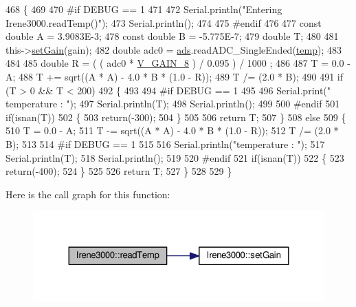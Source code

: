 \begin{DoxyCode}
468 \{
469 
470 \textcolor{preprocessor}{#if DEBUG == 1 }
471 
472     Serial.println(\textcolor{stringliteral}{"Entering Irene3000.readTemp()"});
473     Serial.println();
474 
475 \textcolor{preprocessor}{#endif}
476 
477     \textcolor{keyword}{const} \textcolor{keywordtype}{double} A = 3.9083E-3;
478     \textcolor{keyword}{const} \textcolor{keywordtype}{double} B = -5.775E-7;
479     \textcolor{keywordtype}{double} T;
480 
481     this->\hyperlink{classIrene3000_aff7c5da186b388e7272e63ff88a20c34}{setGain}(gain);
482     \textcolor{keywordtype}{double} adc0 = \hyperlink{classIrene3000_a1215e77ba761c9908d80d691f149e135}{ads}.readADC\_SingleEnded(\hyperlink{Irene3000_8h_a5905d48604152cf57aa6bfa087b49173}{temp});
483 
484 
485     \textcolor{keywordtype}{double} R = ( ( adc0 * \hyperlink{Irene3000_8h_ab7ab16df599d3f0ce29e12791a504891}{V\_GAIN\_8} ) / 0.095 ) / 1000 ;
486 
487     T = 0.0 - A;
488     T += sqrt((A * A) - 4.0 * B * (1.0 - R));
489     T /= (2.0 * B);
490 
491     \textcolor{keywordflow}{if} (T > 0 && T < 200) 
492     \{
493 
494 \textcolor{preprocessor}{    #if DEBUG == 1 }
495 
496         Serial.print(\textcolor{stringliteral}{" temperature : "});
497         Serial.println(T);
498         Serial.println();
499     
500 \textcolor{preprocessor}{    #endif }
501         \textcolor{keywordflow}{if}(isnan(T))
502         \{
503             \textcolor{keywordflow}{return}(-300);           
504         \}
505 
506         \textcolor{keywordflow}{return} T;
507     \}
508     \textcolor{keywordflow}{else} 
509     \{
510         T = 0.0 - A;
511         T -= sqrt((A * A) - 4.0 * B * (1.0 - R));
512         T /= (2.0 * B);
513     
514 \textcolor{preprocessor}{    #if DEBUG == 1 }
515     
516         Serial.println(\textcolor{stringliteral}{"temperature : "});
517         Serial.println(T);
518         Serial.println();
519     
520 \textcolor{preprocessor}{    #endif}
521         \textcolor{keywordflow}{if}(isnan(T))
522         \{
523             \textcolor{keywordflow}{return}(-400);           
524         \}
525 
526         \textcolor{keywordflow}{return} T;
527     \}
528 
529 \}
\end{DoxyCode}
Here is the call graph for this function\+:\nopagebreak
\begin{figure}[H]
\begin{center}
\leavevmode
\includegraphics[width=324pt]{classIrene3000_a94ad40f281d83ad1be20bf1edd6fe802_cgraph}
\end{center}
\end{figure}
